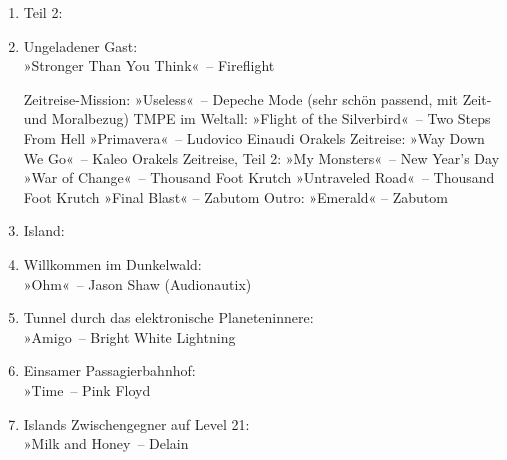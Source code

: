 \begin{enumerate}
    \item Teil 2:\\
    \item Ungeladener Gast:\\ »Stronger Than You Think«~– Fireflight



    Zeitreise-Mission: »Useless«~– Depeche Mode (sehr schön passend, mit Zeit- und Moralbezug)
    TMPE im Weltall: »Flight of the Silverbird«~– Two Steps From Hell
    »Primavera«~– Ludovico Einaudi
    Orakels Zeitreise: »Way Down We Go«~– Kaleo
    Orakels Zeitreise, Teil 2: »My Monsters«~– New Year's Day
    »War of Change«~– Thousand Foot Krutch
    »Untraveled Road«~– Thousand Foot Krutch
    »Final Blast« – Zabutom
    Outro: »Emerald« – Zabutom











    \item Island:\\
    \item Willkommen im Dunkelwald:\\ »Ohm«~– Jason Shaw (Audionautix)
    \item Tunnel durch das elektronische Planeteninnere:\\ »Amigo~– Bright White Lightning
    \item Einsamer Passagierbahnhof:\\ »Time~– Pink Floyd
    \item Islands Zwischengegner auf Level 21:\\ »Milk and Honey~– Delain
\end{enumerate}
